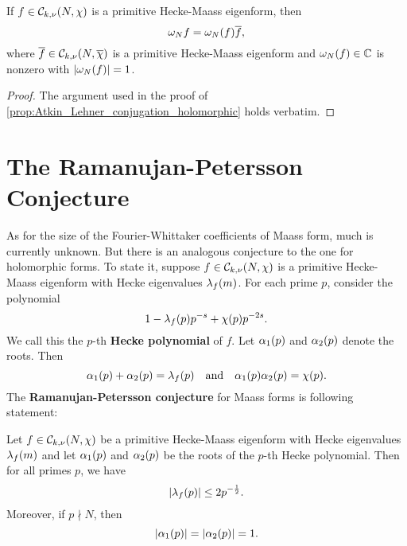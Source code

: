     \begin{proposition}\label{prop:Atkin_Lehner_conjugation_Maass}
      If $f \in \mathcal{C}_{k,\nu}(N,\chi)$ is a primitive Hecke-Maass eigenform, then
      \[
        \omega_{N}f = \omega_{N}(f)\overline{f},
      \]
      where $\overline{f} \in \mathcal{C}_{k,\nu}(N,\overline{\chi})$ is a primitive Hecke-Maass eigenform and $\omega_{N}(f) \in \mathbb{C}$ is nonzero with $|\omega_{N}(f)| = 1$.
    \end{proposition}
    \begin{proof}
      The argument used in the proof of \cref{prop:Atkin_Lehner_conjugation_holomorphic} holds verbatim.
    \end{proof}
  \section{The Ramanujan-Petersson Conjecture}
    As for the size of the Fourier-Whittaker coefficients of Maass form, much is currently unknown. But there is an analogous conjecture to the one for holomorphic forms. To state it, suppose $f \in \mathcal{C}_{k,\nu}(N,\chi)$ is a primitive Hecke-Maass eigenform with Hecke eigenvalues $\lambda_{f}(m)$. For each prime $p$, consider the polynomial
    \[
      1-\lambda_{f}(p)p^{-s}+\chi(p)p^{-2s}.
    \]
    We call this the $p$-th \textbf{Hecke polynomial} of $f$. Let $\alpha_{1}(p)$ and $\alpha_{2}(p)$ denote the roots. Then
    \[
      \alpha_{1}(p)+\alpha_{2}(p) = \lambda_{f}(p) \quad \text{and} \quad \alpha_{1}(p)\alpha_{2}(p) = \chi(p).
    \]
    The \textbf{Ramanujan-Petersson conjecture} for Maass forms is following statement:

    \begin{conjecture*}
      Let $f \in \mathcal{C}_{k,\nu}(N,\chi)$ be a primitive Hecke-Maass eigenform with Hecke eigenvalues $\lambda_{f}(m)$ and let $\alpha_{1}(p)$ and $\alpha_{2}(p)$ be the roots of the $p$-th Hecke polynomial. Then for all primes $p$, we have
      \[
        |\lambda_{f}(p)| \le 2p^{-\frac{1}{2}}.
      \]
      Moreover, if $p \nmid N$, then
      \[
        |\alpha_{1}(p)| = |\alpha_{2}(p)| = 1.
      \]
    \end{conjecture*}

